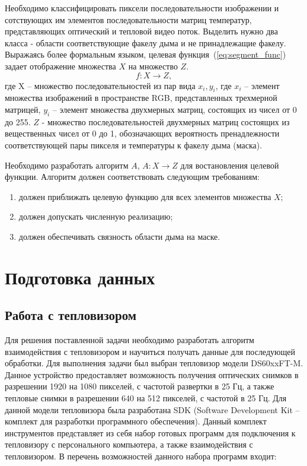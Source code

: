 \documentclass[14pt, a4paper]{extreport}
\begin{document}
	Необходимо классифицировать пиксели последовательности изображении и сотствующих им элементов последовательности матриц температур, представляющих оптический и тепловой видео поток. Выделить нужно два класса - области соответствующие факелу дыма и не принадлежащие факелу. Выражаясь более формальным языком, целевая функция~(\ref{eq:segment_func}) задает отображение множества $X$ на множество $Z$.
	\begin{equation}
		f: X \rightarrow Z,
		\label{eq:segment_func}
	\end{equation}
	где X -- множество последовательностей из пар вида $x_i, y_i$, где $x_i$ -- элемент множества изображений в пространстве RGB, представленных трехмерной матрицей, $y_i$ -- элемент множества двухмерных матриц, состоящих из чисел от 0 до 255. $Z$ - множество последовательностей двухмерных матриц состоящих из вещественных чисел от 0 до 1, обозначающих вероятность пренадлежности соответствующей пары пикселя и температуры к факелу дыма (маска).
	
	Необходимо разработать алгоритм $A$, $A: X \rightarrow Z$ для востановления целевой функции. Алгоритм должен соответствовать следующим требованиям:
	\begin{enumerate}[label={\arabic*)}]
		\item должен приближать целевую функцию для всех элементов множества $X$;
		\item должен допускать численную реализацию;
		\item должен обеспечивать связность области дыма на маске.
	\end{enumerate}

\section{Подготовка данных}
\subsection{Работа с тепловизором}

	Для решения поставленной задачи необходимо разработать алгоритм взаимодействия с тепловизором и научиться получать данные для последующей обработки. Для выполнения задачи был выбран тепловизор модели DS60xxFT-M. Данное устройство предоставляет возможность получения оптических снимков в разрешении 1920 на 1080 пикселей, с частотой развертки в 25 Гц, а также тепловые снимки в разрешении 640 на 512 пикселей, с частотой в 25 Гц. Для данной модели тепловизора была разработана SDK (Software Development Kit -- комплект для разработки программного обеспечения). Данный комплект инструментов представляет из себя набор готовых программ для подключения к тепловизору с персонального компьютера, а также взаимодействия с тепловизором. В перечень возможностей данного набора программ входит:
	
\end{document}
